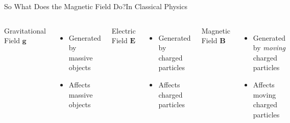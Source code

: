\documentclass[12pt,aspectratio=169]{beamer}
\begin{document}
\begin{frame}{So What Does the Magnetic Field Do?}{In Classical Physics}
  \begin{columns}
    \begin{center}
      Gravitational Field $\bm{g}$
    \end{center}
    \begin{itemize}
    \item Generated by massive objects
    \item Affects massive objects
    \end{itemize}

    \begin{center}
      Electric Field $\bm{E}$
    \end{center}
    \begin{itemize}
    \item Generated by charged particles
    \item Affects charged particles
    \end{itemize}

    \begin{center}
      Magnetic Field $\bm{B}$
    \end{center}
    \begin{itemize}
    \item Generated by \emph{moving} charged particles
    \item Affects moving charged particles
    \end{itemize}
  \end{columns}
\end{frame}
\end{document}
